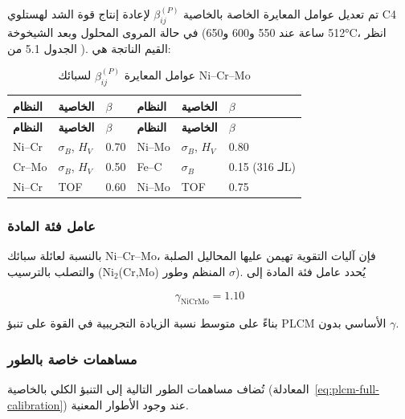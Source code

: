 \documentclass[12pt,a4paper]{article}
\begin{document}
	تم تعديل عوامل المعايرة الخاصة بالخاصية \(\beta_{ij}^{(P)}\) لإعادة إنتاج قوة الشد لهستلوي C4 في حالة المروى المحلول وبعد الشيخوخة (512 ساعة عند 550 و600 و650°C، انظر الجدول 5.1 من \cite{dis2025}). القيم الناتجة هي:
	
	\begin{longtable}{p{1.5cm} p{1.5cm} p{1.5cm} p{1.5cm} p{1.5cm} p{1.5cm}}
		\caption{عوامل المعايرة \(\beta_{ij}^{(P)}\) لسبائك Ni–Cr–Mo}\label{tab:nicrmo_beta}\\
		\toprule
		\textbf{النظام} & \textbf{الخاصية} & \(\beta\) & \textbf{النظام} & \textbf{الخاصية} & \(\beta\) \\
		\midrule
		\endfirsthead
		\toprule
		\textbf{النظام} & \textbf{الخاصية} & \(\beta\) & \textbf{النظام} & \textbf{الخاصية} & \(\beta\) \\
		\midrule
		\endhead
		Ni–Cr   & \(\sigma_B\), \(H_V\) & 0.70 & Ni–Mo   & \(\sigma_B\), \(H_V\) & 0.80 \\
		Cr–Mo   & \(\sigma_B\), \(H_V\) & 0.50 & Fe–C    & \(\sigma_B\)        & 0.15 (لـ 316L) \\
		Ni–Cr   & TOF              & 0.60 & Ni–Mo   & TOF              & 0.75 \\
		\bottomrule
	\end{longtable}
	
	\subsubsection{عامل فئة المادة}
	بالنسبة لعائلة سبائك Ni–Cr–Mo، فإن آليات التقوية تهيمن عليها المحاليل الصلبة والتصلب بالترسيب (Ni\(_2\)(Cr,Mo) المنظم وطور \(\sigma\)). يُحدد عامل فئة المادة إلى
	
	\[
	\gamma_{\text{NiCrMo}} = 1.10
	\]
	
	بناءً على متوسط نسبة الزيادة التجريبية في القوة على تنبؤ PLCM الأساسي بدون \(\gamma\).
	
	\subsubsection{مساهمات خاصة بالطور}
	تُضاف مساهمات الطور التالية إلى التنبؤ الكلي بالخاصية (المعادلة~\ref{eq:plcm-full-calibration}) عند وجود الأطوار المعنية.
	
\end{document}
